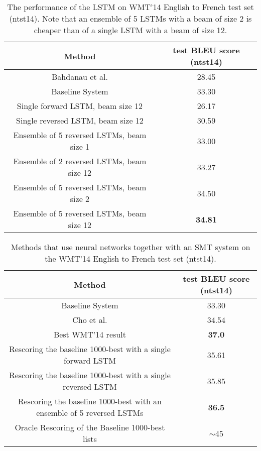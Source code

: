 \documentclass{article} \usepackage{nips14submit_e}
\begin{document}
\begin{table}[t]
\centering
\begin{small}
\begin{tabular}{|c|c|}
\hline
{\bf Method}  & {\bf test BLEU score (ntst14) } \\ \hline
Bahdanau et al. \cite{bog14}  &  28.45 \\ \hline
Baseline System  \cite{wmt14_en_fr} & 33.30 \\ \hline
\hline
Single forward LSTM, beam size 12 & 26.17 \\ \hline                 
Single reversed LSTM, beam size 12 & 30.59 \\ \hline
Ensemble of 5 reversed LSTMs, beam size 1  &  33.00 \\ \hline
Ensemble of 2 reversed LSTMs, beam size 12  &  33.27 \\ \hline
Ensemble of 5 reversed LSTMs, beam size 2  &  34.50 \\ \hline
Ensemble of 5 reversed LSTMs, beam size 12  &  {\bf 34.81} \\ \hline
\end{tabular}
\end{small}
\caption{The performance of the LSTM on WMT'14 English to French test
  set (ntst14).  Note that an ensemble of 5 LSTMs with a beam of size
  2 is cheaper than of a single LSTM with a beam of size 12.  }
\label{tab:blue_fr}
\end{table}

\begin{table}[]
\centering
\begin{small}
\begin{tabular}{|c|c|}
\hline
{\bf Method}  & {\bf test BLEU score (ntst14) } \\ \hline
Baseline System  \cite{wmt14_en_fr} & 33.30 \\ \hline
Cho et al. \cite{cho14}  & 34.54 \\ \hline 
Best WMT'14 result \cite{durrani-EtAl:2014:W14-33} &  {\bf 37.0} \\ \hline
\hline
Rescoring the baseline 1000-best with a single forward LSTM & 35.61 \\ \hline 
Rescoring the baseline 1000-best with a single reversed  LSTM & 35.85 \\ \hline  Rescoring the baseline 1000-best with an ensemble of 5 reversed LSTMs  &  {\bf 36.5} \\ \hline    \hline
Oracle Rescoring of the Baseline 1000-best lists    & $\sim$45 \\ \hline 
\end{tabular}
\end{small}
\caption{Methods that use neural networks together with an SMT system
  on the WMT'14 English to French test set (ntst14).}
\label{tab:blue_fr_rescore}
\end{table}
\end{document}
